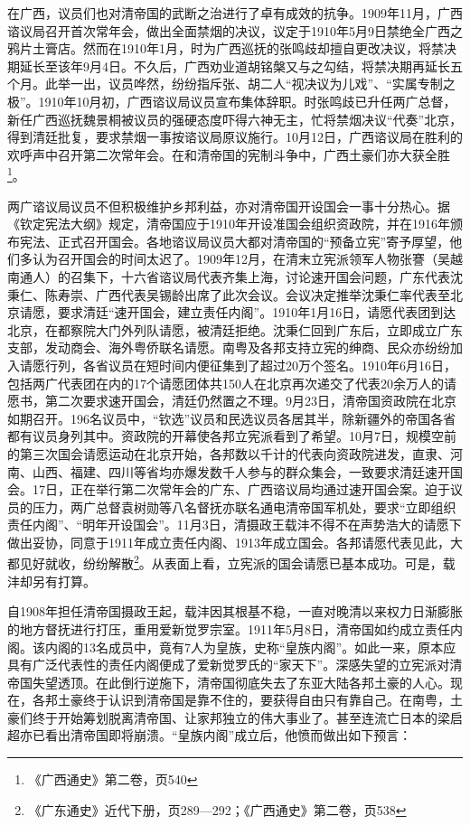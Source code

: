 在广西，议员们也对清帝国的武断之治进行了卓有成效的抗争。1909年11月，广西谘议局召开首次常年会，做出全面禁烟的决议，议定于1910年5月9日禁绝全广西之鸦片土膏店。然而在1910年1月，时为广西巡抚的张鸣歧却擅自更改决议，将禁决期延长至该年9月4日。不久后，广西劝业道胡铭槃又与之勾结，将禁决期再延长五个月。此举一出，议员哗然，纷纷指斥张、胡二人“视决议为儿戏”、“实属专制之极”。1910年10月初，广西谘议局议员宣布集体辞职。时张鸣歧已升任两广总督，新任广西巡抚魏景桐被议员的强硬态度吓得六神无主，忙将禁烟决议“代奏”北京，得到清廷批复，要求禁烟一事按谘议局原议施行。10月12日，广西谘议局在胜利的欢呼声中召开第二次常年会。在和清帝国的宪制斗争中，广西土豪们亦大获全胜\footnote{《广西通史》第二卷，页540}。

两广谘议局议员不但积极维护乡邦利益，亦对清帝国开设国会一事十分热心。据《钦定宪法大纲》规定，清帝国应于1910年开设准国会组织资政院，并在1916年颁布宪法、正式召开国会。各地谘议局议员大都对清帝国的“预备立宪”寄予厚望，他们多认为召开国会的时间太迟了。1909年12月，在清末立宪派领军人物张謇（吴越南通人）的召集下，十六省谘议局代表齐集上海，讨论速开国会问题，广东代表沈秉仁、陈寿崇、广西代表吴锡龄出席了此次会议。会议决定推举沈秉仁率代表至北京请愿，要求清廷“速开国会，建立责任内阁”。1910年1月16日，请愿代表团到达北京，在都察院大门外列队请愿，被清廷拒绝。沈秉仁回到广东后，立即成立广东支部，发动商会、海外粤侨联名请愿。南粤及各邦支持立宪的绅商、民众亦纷纷加入请愿行列，各省议员在短时间内便征集到了超过20万个签名。1910年6月16日，包括两广代表团在内的17个请愿团体共150人在北京再次递交了代表20余万人的请愿书，第二次要求速开国会，清廷仍然置之不理。9月23日，清帝国资政院在北京如期召开。196名议员中，“钦选”议员和民选议员各居其半，除新疆外的帝国各省都有议员身列其中。资政院的开幕使各邦立宪派看到了希望。10月7日，规模空前的第三次国会请愿运动在北京开始，各邦数以千计的代表向资政院进发，直隶、河南、山西、福建、四川等省均亦爆发数千人参与的群众集会，一致要求清廷速开国会。17日，正在举行第二次常年会的广东、广西谘议局均通过速开国会案。迫于议员的压力，两广总督袁树勋等八名督抚亦联名通电清帝国军机处，要求“立即组织责任内阁”、“明年开设国会”。11月3日，清摄政王载沣不得不在声势浩大的请愿下做出妥协，同意于1911年成立责任内阁、1913年成立国会。各邦请愿代表见此，大都见好就收，纷纷解散\footnote{《广东通史》近代下册，页289—292；《广西通史》第二卷，页538}。从表面上看，立宪派的国会请愿已基本成功。可是，载沣却另有打算。

自1908年担任清帝国摄政王起，载沣因其根基不稳，一直对晚清以来权力日渐膨胀的地方督抚进行打压，重用爱新觉罗宗室。1911年5月8日，清帝国如约成立责任内阁。该内阁的13名成员中，竟有7人为皇族，史称“皇族内阁”。如此一来，原本应具有广泛代表性的责任内阁便成了爱新觉罗氏的“家天下”。深感失望的立宪派对清帝国失望透顶。在此倒行逆施下，清帝国彻底失去了东亚大陆各邦土豪的人心。现在，各邦土豪终于认识到清帝国是靠不住的，要获得自由只有靠自己。在南粤，土豪们终于开始筹划脱离清帝国、让家邦独立的伟大事业了。甚至连流亡日本的梁启超亦已看出清帝国即将崩溃。“皇族内阁”成立后，他愤而做出如下预言：

